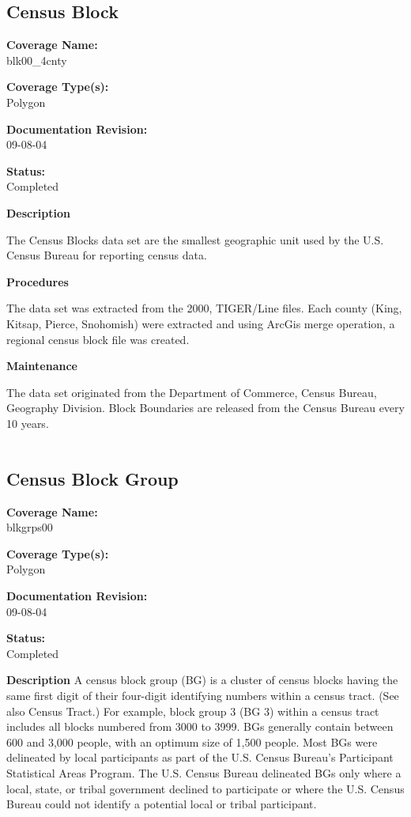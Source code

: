 \subsection{Census Block}
{\bf \large Coverage Name:}\\
blk00\_4cnty

{\bf \large Coverage Type(s):}\\
Polygon

{\bf \large Documentation Revision:}\\
09-08-04

{\bf \large Status:}\\
Completed

{\bf \large Description}

The Census Blocks data set are the smallest geographic unit used
by the U.S. Census Bureau for reporting census data.

{\bf \large Procedures}

The data set was extracted from the 2000, TIGER/Line files. Each
county (King, Kitsap, Pierce, Snohomish) were extracted and using
ArcGis merge operation, a regional census block file was created.

{\bf \large Maintenance}

The data set originated from the Department of Commerce, Census
Bureau, Geography Division. Block Boundaries are released from the
Census Bureau every 10 years.

\begin{landscape}
\begin{longtable}{llrrrrrc}

\end{longtable}
\end{landscape}
\newpage

\subsection{Census Block Group}
{\bf \large Coverage Name:}\\
blkgrps00

{\bf \large Coverage Type(s):}\\
Polygon

{\bf \large Documentation Revision:}\\
09-08-04

{\bf \large Status:}\\
Completed

{\bf \large Description} A census block group (BG) is a cluster of
census blocks having the same first digit of their four-digit
identifying numbers within a census tract. (See also Census
Tract.) For example, block group 3 (BG 3) within a census tract
includes all blocks numbered from 3000 to 3999. BGs generally
contain between 600 and 3,000 people, with an optimum size of
1,500 people. Most BGs were delineated by local participants as
part of the U.S. Census Bureau's Participant Statistical Areas
Program. The U.S. Census Bureau delineated BGs only where a local,
state, or tribal government declined to participate or where the
U.S. Census Bureau could not identify a potential local or tribal
participant.

